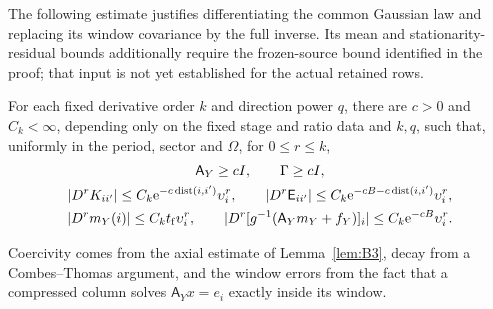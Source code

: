 The following estimate justifies differentiating the common Gaussian law and replacing its window covariance by the full inverse. Its mean and stationarity-residual bounds additionally require the frozen-source bound identified in the proof; that input is not yet established for the actual retained rows.
\begin{lemma}\label{lem:B-windows}
For each fixed derivative order $k$ and direction power $q$, there are $c>0$ and $C_k<\infty$, depending only on the fixed stage and ratio data and $k,q$, such that, uniformly in the period, sector and $\Omega$, for $0\le r\le k$,
\begin{gather*}
\mathsf A_Y\ge cI,\qquad\Gamma\ge cI,\\
|D^rK_{ii'}|\le C_k\mathrm e^{-c\operatorname{dist}(i,i')}\upsilon_i^r,\qquad
|D^r\mathsf E_{ii'}|\le C_k\mathrm e^{-cB-c\operatorname{dist}(i,i')}\upsilon_i^r,\\
|D^rm_Y(i)|\le C_kt_{\rm f}\upsilon_i^r,\qquad
|D^r[g^{-1}(\mathsf A_Ym_Y+f_Y)]_i|\le C_k\mathrm e^{-cB}\upsilon_i^r.
\end{gather*}
\end{lemma}
Coercivity comes from the axial estimate of Lemma~\ref{lem:B3}, decay from a Combes--Thomas argument, and the window errors from the fact that a compressed column solves $\mathsf A_Yx=e_i$ exactly inside its window.
